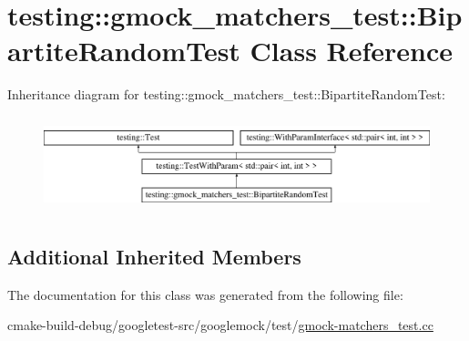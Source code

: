 \hypertarget{classtesting_1_1gmock__matchers__test_1_1BipartiteRandomTest}{}\section{testing\+::gmock\+\_\+matchers\+\_\+test\+::Bipartite\+Random\+Test Class Reference}
\label{classtesting_1_1gmock__matchers__test_1_1BipartiteRandomTest}
Inheritance diagram for testing\+::gmock\+\_\+matchers\+\_\+test\+::Bipartite\+Random\+Test\+:\begin{figure}[H]
\begin{center}
\leavevmode
\includegraphics[height=2.781457cm]{classtesting_1_1gmock__matchers__test_1_1BipartiteRandomTest}
\end{center}
\end{figure}
\subsection*{Additional Inherited Members}


The documentation for this class was generated from the following file\+:\begin{DoxyCompactItemize}
\item 
cmake-\/build-\/debug/googletest-\/src/googlemock/test/\mbox{\hyperlink{gmock-matchers__test_8cc}{gmock-\/matchers\+\_\+test.\+cc}}\end{DoxyCompactItemize}
